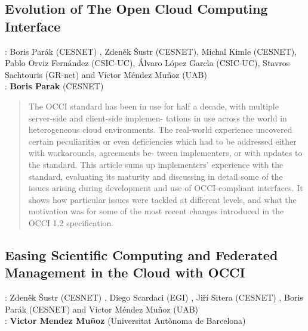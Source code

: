 \documentclass[10pt,a4paper]{article}
\begin{document}
\subsection*{Evolution of The Open Cloud Computing Interface \cite{par16a}}

: Boris Parák (CESNET) , Zdeněk Šustr (CESNET), Michal Kimle (CESNET), Pablo Orviz Fernández (CSIC-UC), \'Alvaro L\'opez Garc\`ia (CSIC-UC), Stavros Sachtouris (GR-net) and V\'ictor Méndez Muñoz (UAB)\\ 
: {\bf Boris Parak} (CESNET)

\begin{quote}
	The OCCI standard has been in use for half a decade, with multiple server-side and client-side implemen-
	tations in use across the world in heterogeneous cloud environments. The real-world experience uncovered
	certain peculiarities or even deficiencies which had to be addressed either with workarounds, agreements be-
	tween implementers, or with updates to the standard. This article sums up implementers’ experience with the
	standard, evaluating its maturity and discussing in detail some of the issues arising during development and
	use of OCCI-compliant interfaces. It shows how particular issues were tackled at different levels, and what
	the motivation was for some of the most recent changes introduced in the OCCI 1.2 specification.
\end{quote}

\subsection*{Easing Scientific Computing and Federated Management in the Cloud with OCCI \cite{sus16a}}

: Zdeněk Šustr (CESNET) , Diego Scardaci (EGI) , Ji\v{r}\'i Sitera (CESNET) , Boris Par\'{a}k (CESNET) and V\'ictor M\'endez Mu\~{n}oz (UAB)\\
: {\bf Victor Mendez Mu\~{n}oz} (Universitat Aut\`onoma de Barcelona)
\end{document}
